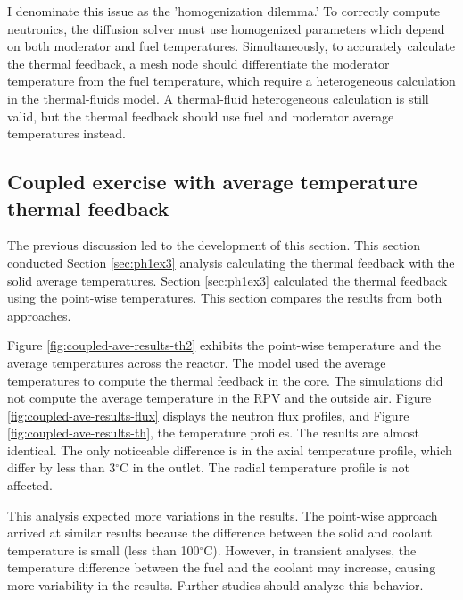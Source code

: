 I denominate this issue as the 'homogenization dilemma.'
To correctly compute neutronics, the diffusion solver must use homogenized parameters which depend on both moderator and fuel temperatures.
Simultaneously, to accurately calculate the thermal feedback, a mesh node should differentiate the moderator temperature from the fuel temperature, which require a heterogeneous calculation in the thermal-fluids model.
A thermal-fluid heterogeneous calculation is still valid, but the thermal feedback should use fuel and moderator average temperatures instead.

\subsection{Coupled exercise with average temperature thermal feedback}
\label{sec:coupled-average}

The previous discussion led to the development of this section.
This section conducted Section \ref{sec:ph1ex3} analysis calculating the thermal feedback with the solid average temperatures.
Section \ref{sec:ph1ex3} calculated the thermal feedback using the point-wise temperatures.
This section compares the results from both approaches.

Figure \ref{fig:coupled-ave-results-th2} exhibits the point-wise temperature and the average temperatures across the reactor.
The model used the average temperatures to compute the thermal feedback in the core.
The simulations did not compute the average temperature in the RPV and the outside air.
Figure \ref{fig:coupled-ave-results-flux} displays the neutron flux profiles, and Figure \ref{fig:coupled-ave-results-th}, the temperature profiles.
The results are almost identical.
The only noticeable difference is in the axial temperature profile, which differ by less than 3$^{\circ}$C in the outlet.
The radial temperature profile is not affected.

This analysis expected more variations in the results.
The point-wise approach arrived at similar results because the difference between the solid and coolant temperature is small (less than 100$^{\circ}$C).
However, in transient analyses, the temperature difference between the fuel and the coolant may increase, causing more variability in the results.
Further studies should analyze this behavior.


